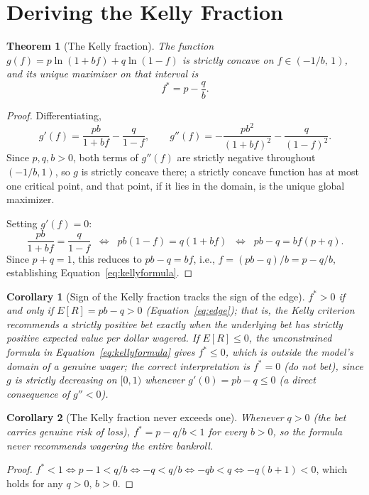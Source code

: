 \documentclass[11pt]{article}
\newtheorem{theorem}{Theorem}
\newtheorem{corollary}{Corollary}
\theoremstyle{remark}
\theoremstyle{definition}
\begin{document}
\section{Deriving the Kelly Fraction}
\label{sec:derivation}

\begin{theorem}[The Kelly fraction]
\label{thm:kelly}
The function $g(f) = p\ln(1+bf) + q\ln(1-f)$ is strictly concave on $f\in(-1/b,\,1)$, and its unique maximizer on that interval is
\begin{equation}
f^{*} = p - \frac{q}{b}.
\label{eq:kellyformula}
\end{equation}
\end{theorem}
\begin{proof}
Differentiating,
\begin{equation}
g'(f) = \frac{pb}{1+bf} - \frac{q}{1-f}, \qquad
g''(f) = -\frac{pb^2}{(1+bf)^2} - \frac{q}{(1-f)^2}.
\label{eq:derivatives}
\end{equation}
Since $p,q,b>0$, both terms of $g''(f)$ are strictly negative throughout $(-1/b,1)$, so $g$ is strictly concave there; a strictly concave function has at most one critical point, and that point, if it lies in the domain, is the unique global maximizer.

Setting $g'(f)=0$:
\begin{equation}
\frac{pb}{1+bf} = \frac{q}{1-f}
\;\;\Longleftrightarrow\;\;
pb(1-f) = q(1+bf)
\;\;\Longleftrightarrow\;\;
pb - q = bf(p+q).
\end{equation}
Since $p+q=1$, this reduces to $pb-q = bf$, i.e., $f = (pb-q)/b = p - q/b$, establishing Equation~\eqref{eq:kellyformula}.
\end{proof}

\begin{corollary}[Sign of the Kelly fraction tracks the sign of the edge]
\label{cor:sign}
$f^{*}>0$ if and only if $E[R] = pb-q>0$ (Equation~\eqref{eq:edge}); that is, the Kelly criterion recommends a strictly positive bet exactly when the underlying bet has strictly positive expected value per dollar wagered. If $E[R]\le 0$, the unconstrained formula in Equation~\eqref{eq:kellyformula} gives $f^{*}\le 0$, which is outside the model's domain of a genuine wager; the correct interpretation is $f^{*}=0$ (do not bet), since $g$ is strictly decreasing on $[0,1)$ whenever $g'(0)=pb-q\le 0$ (a direct consequence of $g''<0$).
\end{corollary}

\begin{corollary}[The Kelly fraction never exceeds one]
\label{cor:bounded}
Whenever $q>0$ (the bet carries genuine risk of loss), $f^{*}=p-q/b<1$ for every $b>0$, so the formula never recommends wagering the entire bankroll.
\end{corollary}
\begin{proof}
$f^*<1 \iff p-1 < q/b \iff -q<q/b \iff -qb<q \iff -q(b+1)<0$, which holds for any $q>0,\,b>0$.
\end{proof}
\end{document}
